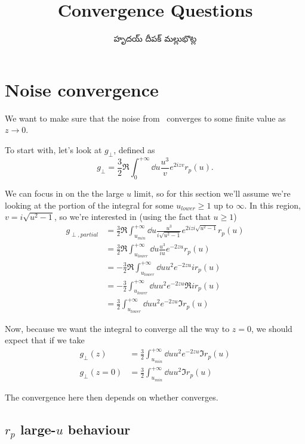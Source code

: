 \documentclass[../main.tex]{subfiles}
\title{Convergence Questions}
\author{\begin{telugu}హృదయ్ దీపక్ మల్లుభొట్ల\end{telugu}}
\date{}
\begin{document}
	\graphicspath{{\main/figures/}}

	\onlyinsubfile{\maketitle}

	\section{Noise convergence} \label{sec:convergence}

	We want to make sure that the noise from~\cite{Henkel1999} converges to some finite value as $z \rightarrow 0$.

	To start with, let's look at $g_\perp$, defined as
	\begin{equation}
		g_\perp = \frac32 \Re \int_0^{+\infty} \dd{u} \frac{u^3}{v} e^{2 i z v} r_p(u).
	\end{equation}

	We can focus in on the the large $u$ limit, so for this section we'll assume we're looking at the portion of the integral
	for some $u_{lower} \geq 1$ up to $\infty$.
	In this region, $v = i \sqrt{u^2 - 1}$, so we're interested in (using the fact that $u \geq 1$)
	\begin{align}
		g_{\perp,partial} &= \frac32 \Re \int_{u_{min}}^{+\infty} \dd{u} \frac{u^3}{i \sqrt{u^2 - 1}} e^{2 i z i \sqrt{u^2 - 1}} r_p(u) \\
		&= \frac32 \Re \int_{u_{lower}}^{+\infty} \dd{u} \frac{u^3}{i u} e^{-2 z u} r_p(u) \\
		&= - \frac32 \Re \int_{u_{lower}}^{+\infty} \dd{u} u^2 e^{-2 z u} i r_p(u) \\
		&= - \frac32 \int_{u_{lower}}^{+\infty} \dd{u} u^2 e^{-2 z u} \Re{i r_p(u)} \\
		&= \frac32 \int_{u_{lower}}^{+\infty} \dd{u} u^2 e^{-2 z u} \Im r_p(u)
	\end{align}

	Now, because we want the integral to converge all the way to $z = 0$, we should expect that if we take
	\begin{align}
		g_\perp(z) &= \frac32 \int_{u_{min}}^{+\infty} \dd{u} u^2 e^{-2 z u} \Im r_p(u) \\
		g_\perp(z = 0) &= \frac32 \int_{u_{min}}^{+\infty} \dd{u} u^2 \Im r_p(u) \label{eq:gperpsimplest}
	\end{align}

	The convergence here then depends on whether  converges.

	\subsection{\texorpdfstring{$r_p$}{rp} large-\texorpdfstring{$u$}{u} behaviour} \label{subsec:largeurpbehav}
\end{document}
